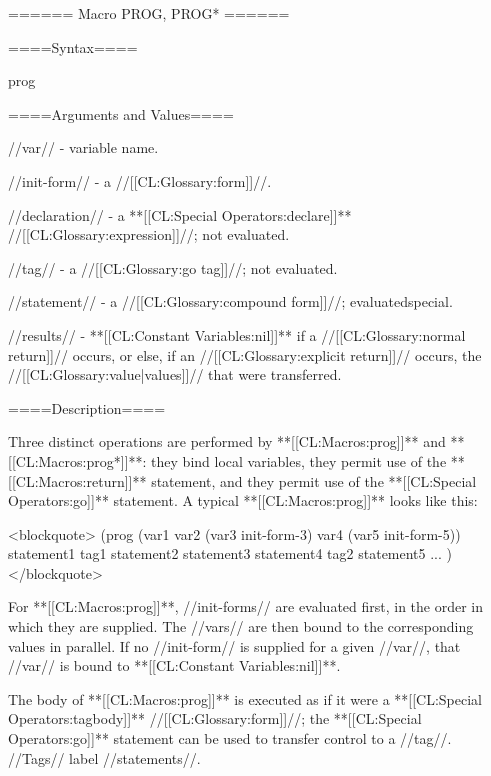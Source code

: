 ====== Macro PROG, PROG* ======

====Syntax====

\DefmacWithValuesNewline prog {  } {}

 {  } {}

====Arguments and Values====

//var// - variable name.

//init-form// - a //[[CL:Glossary:form]]//.

//declaration// - a **[[CL:Special Operators:declare]]** //[[CL:Glossary:expression]]//; not evaluated.

//tag// - a //[[CL:Glossary:go tag]]//; not evaluated.

//statement// - a //[[CL:Glossary:compound form]]//; evaluatedspecial.

//results// - **[[CL:Constant Variables:nil]]** if a //[[CL:Glossary:normal return]]// occurs, or else, if an //[[CL:Glossary:explicit return]]// occurs, the //[[CL:Glossary:value|values]]// that were transferred.

====Description====

Three distinct operations are performed by **[[CL:Macros:prog]]** and **[[CL:Macros:prog*]]**: they bind local variables, they permit use of the **[[CL:Macros:return]]** statement, and they permit use of the **[[CL:Special Operators:go]]** statement. A typical **[[CL:Macros:prog]]** looks like this:

<blockquote> (prog (var1 var2 (var3 init-form-3) var4 (var5 init-form-5))  statement1 tag1 statement2 statement3 statement4 tag2 statement5 ... ) </blockquote>

For **[[CL:Macros:prog]]**, //init-forms// are evaluated first, in the order in which they are supplied. The //vars// are then bound to the corresponding values in parallel. If no //init-form// is supplied for a given //var//, that //var// is bound to **[[CL:Constant Variables:nil]]**.

The body of **[[CL:Macros:prog]]** is executed as if it were a **[[CL:Special Operators:tagbody]]** //[[CL:Glossary:form]]//; the **[[CL:Special Operators:go]]** statement can be used to transfer control to a //tag//. //Tags// label //statements//.

